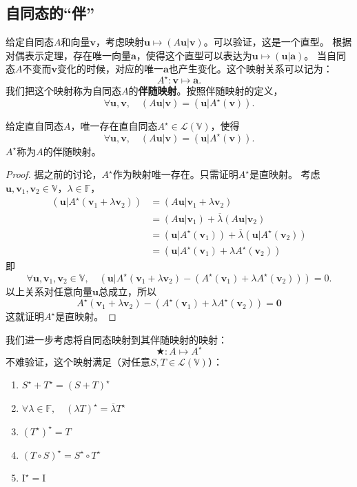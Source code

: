 \documentclass[12pt,UTF8,fontset=none]{ctexbook}
\begin{document}
\subsection{自同态的“伴”}
给定自同态$A$和向量$\mathbf{v}$，考虑映射$\mathbf{u} \mapsto (A\mathbf{u} | \mathbf{v})$。可以验证，这是一个直型。
根据对偶表示定理，存在唯一向量$\mathbf{a}$，使得这个直型可以表达为$\mathbf{u} \mapsto (\mathbf{u} | \mathbf{a})$。
当自同态$A$不变而$\mathbf{v}$变化的时候，对应的唯一$\mathbf{a}$也产生变化。这个映射关系可以记为：
$$ A^\star : \mathbf{v} \mapsto \mathbf{a}. $$
我们把这个映射称为自同态$A$的\textbf{伴随映射}。按照伴随映射的定义，
$$ \forall \mathbf{u}, \mathbf{v}, \quad (A\mathbf{u} | \mathbf{v}) = (\mathbf{u} | A^\star(\mathbf{v})). $$
\begin{pp}\label{pp:8_3}
    给定直自同态$A$，唯一存在直自同态$A^\star \in \mathcal{L}(\mathbb{V})$，使得
    $$ \forall \mathbf{u}, \mathbf{v}, \quad (A\mathbf{u} | \mathbf{v}) = (\mathbf{u} | A^\star(\mathbf{v})). $$
    $A^\star$称为$A$的伴随映射。
\end{pp}
\begin{proof} %
    据之前的讨论，$A^\star$作为映射唯一存在。只需证明$A^\star$是直映射。
    考虑$\mathbf{u}, \mathbf{v}_1, \mathbf{v}_2 \in \mathbb{V}$，$\lambda \in \mathbb{F}$，
    \begin{align*}
        (\mathbf{u} | A^\star(\mathbf{v}_1 + \lambda \mathbf{v}_2)) &= (A\mathbf{u} | \mathbf{v}_1 + \lambda \mathbf{v}_2)  \\
        &= (A\mathbf{u} | \mathbf{v}_1) + \overline{\lambda} (A\mathbf{u} | \mathbf{v}_2)  \\
        &= (\mathbf{u} | A^\star(\mathbf{v}_1)) + \overline{\lambda} (\mathbf{u} | A^\star(\mathbf{v}_2))  \\
        &= (\mathbf{u} | A^\star(\mathbf{v}_1) + \lambda A^\star(\mathbf{v}_2)) 
    \end{align*}
    即
    $$ \forall \mathbf{u}, \mathbf{v}_1, \mathbf{v}_2 \in \mathbb{V}, \quad (\mathbf{u} | A^\star(\mathbf{v}_1 + \lambda \mathbf{v}_2) - (A^\star(\mathbf{v}_1) + \lambda A^\star(\mathbf{v}_2))) = 0.$$
    以上关系对任意向量$\mathbf{u}$总成立，所以
    $$ A^\star(\mathbf{v}_1 + \lambda \mathbf{v}_2) - (A^\star(\mathbf{v}_1) + \lambda A^\star(\mathbf{v}_2)) = \mathbf{0} $$
    这就证明$A^\star$是直映射。

\end{proof}


我们进一步考虑将自同态映射到其伴随映射的映射：
$$ \bigstar : A \mapsto A^\star $$
不难验证，这个映射满足（对任意$S, T \in \mathcal{L}(\mathbb{V})$）：
\begin{enumerate}
    \item $S^\star + T^\star = (S + T)^\star$
    \item $\forall \lambda \in \mathbb{F}, \quad (\lambda T)^\star = \overline{\lambda} T^\star$
    \item $ (T^\star)^\star = T $
    \item $ (T\circ S)^\star = S^\star \circ T^\star$
    \item $ \mathrm{I}^\star = \mathrm{I}$
\end{enumerate}
\end{document}
